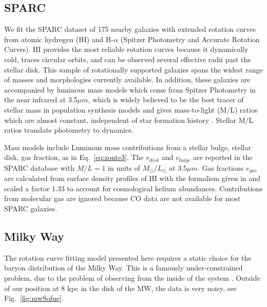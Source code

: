 \documentclass[reprint,%
 amsmath,amssymb,
 aps,
]{revtex4-1}
\begin{document}
 \subsection{SPARC }
 We fit the SPARC dataset  of  175 nearby galaxies with extended rotation curves from atomic hydrogen (HI)  and H-$\alpha$ (Spitzer Photometry and Accurate Rotation Curves)\cite{2016Lelli}. HI provides the most reliable
 rotation curves because it dynamically cold, traces circular orbits, and can be observed several effective radii past the stellar disk. 
 This sample of rotationally supported galaxies   spans the widest range of masses and morphologies currently available. In addition, these galaxies are  accompanied by luminous mass models which come from   Spitzer Photometry in the 
   near infrared  at 3.5$\mu m$, which is widely believed to be the best tracer of stellar mass   in population synthesis models and   gives mass-to-light (M/L) ratios which are almost constant, independent of star formation history \cite{BelldYong,10.1093/mnras/sty3223}.  Stellar M/L ratios   translate   photometry to dynamics. 
   
   Mass models include Luminous mass contributions from a stellar bulge, stellar disk, gas fraction, as   in Eq.~\ref{eq:zonte3}.   The $v_{disk}$ and $v_{bulge}$ are reported in the SPARC database with $ M/L = 1$ in units of  $M_{\odot} / L_{\odot}$   at 3.5$\mu m$.
   Gas fractions $v_{gas}$ are calculated from surface density profiles of HI  with the formalism given in  \cite{1983MNRAS.203..735C} and scaled 
     a factor 1.33 to account for cosmological helium abundances.  Contributions from molecular gas are ignored   because CO data are not available for most SPARC galaxies. 
   
 
  
 


   
 


\subsection{Milky Way}
The rotation curve fitting model presented here requires a static choice for the baryon distribution of the   Milky Way.   This is a   famously under-constrained problem, due to  the    problem of observing from the     inside of the system  \cite{1991ARA&A..29..409F}.
 Outside of our position at 8 kpc in the disk of the MW, the data is very 
 noisy, see  Fig.~\ref{fig:mwSofue}.
 
\end{document}
